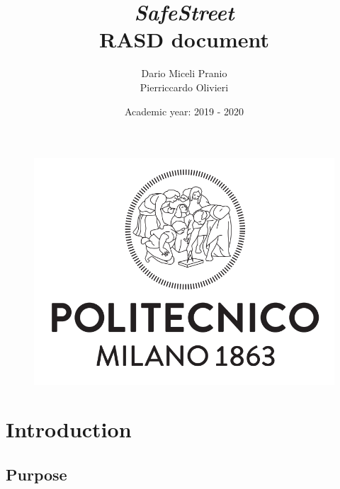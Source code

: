 \documentclass{article}
\title{
    \textbf{\textit{SafeStreet}} \\
    \textbf{RASD document}}
\date{Academic year: 2019 - 2020}
\author{
    Dario Miceli Pranio \\
    Pierriccardo Olivieri
}
\begin{document}

\maketitle

\begin{figure}[h!]
    \centering
    \includegraphics[scale=0.5]{img/logo.png}
\end{figure}

\newpage
{}
\tableofcontents

\newpage
\section{Introduction}

\subsection{Purpose}
\subsubsection{}
\end{document}
